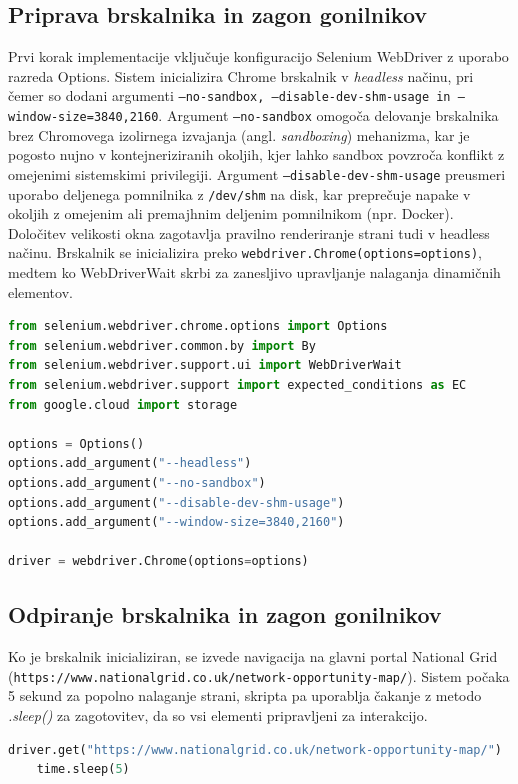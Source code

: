 \documentclass[a4paper,12pt,openright]{book}
\begin{document}
\subsection{Priprava brskalnika in zagon gonilnikov}
Prvi korak implementacije vključuje konfiguracijo Selenium WebDriver z uporabo razreda Options. Sistem inicializira Chrome brskalnik v \textit{headless} načinu, pri čemer so dodani argumenti \texttt{--no-sandbox, --disable-dev-shm-usage in --window-size=3840,2160}. Argument \texttt{--no-sandbox} omogoča delovanje brskalnika brez Chromovega izolirnega izvajanja (angl. \textit{sandboxing}) mehanizma, kar je pogosto nujno v kontejneriziranih okoljih, kjer lahko sandbox povzroča konflikt z omejenimi sistemskimi privilegiji. Argument \texttt{--disable-dev-shm-usage} preusmeri uporabo deljenega pomnilnika z \texttt{/dev/shm} na disk, kar preprečuje napake v okoljih z omejenim ali premajhnim deljenim pomnilnikom (npr. Docker). Določitev velikosti okna zagotavlja pravilno renderiranje strani tudi v headless načinu. Brskalnik se inicializira preko \texttt{webdriver.Chrome(options=options)}, medtem ko WebDriverWait skrbi za zanesljivo upravljanje nalaganja dinamičnih elementov.
\begin{lstlisting}[language=Python, caption={Priprava brskalnika}, captionpos=b, label={lst:mcts}]
from selenium.webdriver.chrome.options import Options
from selenium.webdriver.common.by import By
from selenium.webdriver.support.ui import WebDriverWait
from selenium.webdriver.support import expected_conditions as EC
from google.cloud import storage

options = Options()
options.add_argument("--headless")
options.add_argument("--no-sandbox")
options.add_argument("--disable-dev-shm-usage")
options.add_argument("--window-size=3840,2160")

driver = webdriver.Chrome(options=options)
\end{lstlisting}


\subsection{Odpiranje brskalnika in zagon gonilnikov}
Ko je brskalnik inicializiran, se izvede navigacija na glavni portal National Grid (\texttt{https://www.nationalgrid.co.uk/network-opportunity-map/}). Sistem počaka 5 sekund za popolno nalaganje strani, skripta pa uporablja čakanje z metodo \textit{.sleep()} za zagotovitev, da so vsi elementi pripravljeni za interakcijo.
\begin{lstlisting}[language=Python, caption={Odpiranje strani}, captionpos=b, label={lst:mcts}]
    driver.get("https://www.nationalgrid.co.uk/network-opportunity-map/")
    time.sleep(5)
\end{lstlisting}
\end{document}
